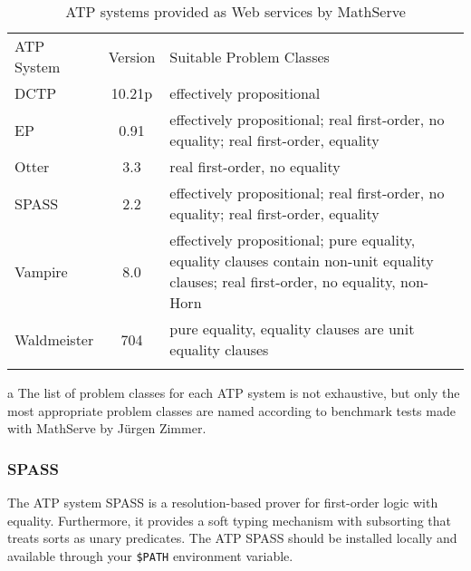 \documentclass{article}
\newcommand{\normalTEXTSC}[2]{{#1\scriptsize#2}}
\newcommand     {\SPASS}{\normalTEXTSC{S}{PASS}\xspace}
\begin{document}
\begin{table}[t]
  \centering
  \begin{threeparttable}
    \begin{tabular}{|l|c|p{7cm}|}\firsthline
      ATP System & Version & Suitable Problem Classes\tnote{a}\\
      \hhline{|=|=|=|}
      DCTP & 10.21p & effectively propositional \\\hline
      EP & 0.91 & effectively propositional; real first-order, no
      equality; real first-order, equality\\\hline
      Otter & 3.3 & real first-order, no equality\\\hline
      \SPASS & 2.2 & effectively propositional; real first-order, no
      equality; real first-order, equality\\\hline
      Vampire & 8.0 & effectively propositional; pure equality, equality
      clauses contain non-unit equality clauses; real first-order, no
      equality, non-Horn\\\hline
      Waldmeister & 704 & pure equality, equality clauses are unit
      equality clauses\\\lasthline
    \end{tabular}
    \begin{tablenotes}\footnotesize
    \item[a]
      {The list of problem classes for each ATP system is not
        exhaustive, but only the most appropriate problem classes are
        named according to benchmark tests made with MathServe by
        J\"urgen Zimmer.}
    \end{tablenotes}
  \end{threeparttable}
  \caption{ATP systems provided as Web services by MathServe}
\vspace*{-4mm}
  \label{tab:MathServe}
\end{table}

\subsubsection*{\SPASS}

The ATP system \SPASS \cite{WeidenbachEtAl02} is a resolution-based
prover for first-order logic with equality. Furthermore, it provides a soft
typing mechanism with subsorting that treats sorts as unary
predicates. The ATP \SPASS should be installed locally and available
through your \verb,$PATH, environment variable.
\end{document}
